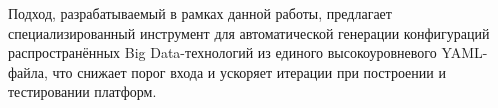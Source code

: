 Подход, разрабатываемый в рамках данной работы, предлагает специализированный инструмент для автоматической генерации конфигураций распространённых Big Data-технологий из единого высокоуровневого YAML-файла, что снижает порог входа и ускоряет итерации при построении и тестировании платформ.











